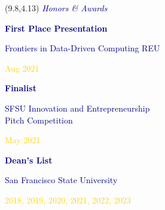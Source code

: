 \documentclass[hidelinks, 10pt]{article}
\begin{document}

\begin{textblock}{4}(9.8,4.13)
    \setlength{\parindent}{0cm}
    \large{\textcolor{navy}{\textit{Honors \& Awards}}}

    \vspace{1mm}

    \footnotesize\textcolor{navy}{\scriptsize\textbf{First Place Presentation}}

    \vspace{0.5mm}

    \footnotesize\textcolor{navy}{\scriptsize Frontiers in Data-Driven Computing
        REU}

    \vspace{0.5mm}

    \scriptsize\textcolor{gold}{\scriptsize Aug 2021}

    \vspace{1mm}

    \footnotesize\textcolor{navy}{\scriptsize\textbf{Finalist}}

    \vspace{0.5mm}

    \scriptsize\textcolor{navy}{\scriptsize SFSU Innovation and Entrepreneurship\\Pitch Competition}

    \vspace{0.5mm}

    \scriptsize\textcolor{gold}{\scriptsize May 2021}

    \vspace{1mm}

    \footnotesize\textcolor{navy}{\scriptsize\textbf{Dean's List}}

    \vspace{0.5mm}

    \scriptsize\textcolor{navy}{\scriptsize San Francisco State University}

    \vspace{0.5mm}

    \scriptsize\textcolor{gold}{\scriptsize 2018, 2019, 2020, 2021, 2022, 2023}
\end{textblock}

\end{document}
